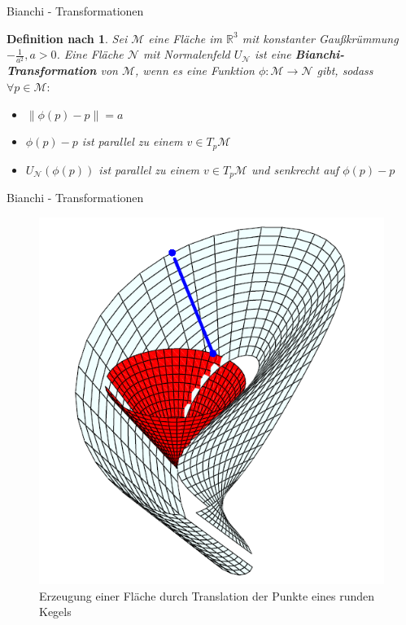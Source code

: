 \documentclass[12pt]{beamer}
\newtheorem{mydef}{Definition nach \cite{gray}}
\newcommand{\norm}[1]{\left\lVert#1\right\rVert}
\begin{document}
\begin{frame}{Bianchi - Transformationen}
\begin{mydef}
Sei $\mathcal{M}$ eine Fläche im $\mathbb{R}^3$ mit konstanter Gaußkrümmung $-\frac{1}{a^2}, a > 0$. \newline Eine Fläche $\mathcal{N}$ mit Normalenfeld $U_{\mathcal{N}}$ ist eine \textbf{Bianchi-Transformation} von $\mathcal{M}$, wenn es eine Funktion $\phi : \mathcal{M} \rightarrow \mathcal{N}$ gibt, sodass $\forall p \in \mathcal{M}:$\newline
\begin{itemize}
\item $\norm{\phi (p) - p} = a$
\item $\phi (p) - p$ ist parallel zu einem $v \in T_{p}\mathcal{M}$
\item $U_{\mathcal{N}} (\phi (p))$ ist parallel zu einem $v \in T_{p}\mathcal{M}$ und senkrecht auf $\phi (p) - p$
\end{itemize}
\end{mydef}
\end{frame}

\begin{frame}{Bianchi - Transformationen}
\begin{figure}[h!]
\includegraphics[scale=0.5]{bianchi_transform_def.png}
\caption{Erzeugung einer Fläche durch Translation der Punkte eines runden Kegels}
\end{figure}

\end{frame}
\end{document}

